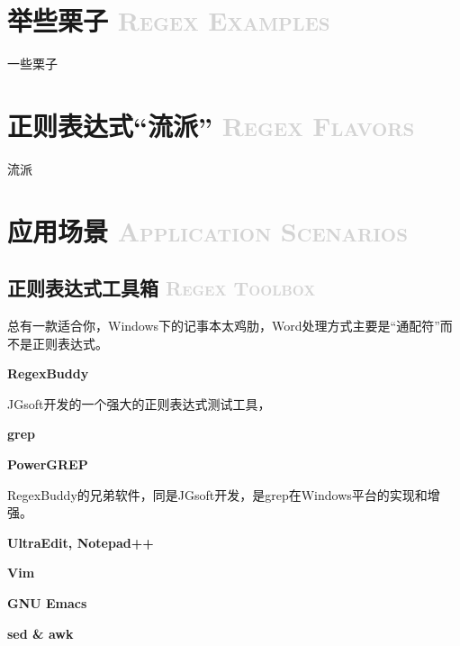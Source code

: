 \documentclass[12pt,a4paper,twoside]{ctexart}
\begin{document}
\section[举些栗子]{举些栗子 \textcolor{lightgray}{\textsc{Regex Examples}}}
\label{sec:regex-examples}

\begin{multicols}{2}
一些栗子 \par


\end{multicols}

\section[正则表达式“流派”]{正则表达式“流派” \textcolor{lightgray}{\textsc{Regex Flavors}}}
\label{sec:flavor}

\begin{multicols}{2}
流派

\end{multicols}


\section[应用场景]{应用场景 \textcolor{lightgray}{\textsc{Application Scenarios}}}
\label{sec:scenarios}

\subsection[正则表达式工具箱]{正则表达式工具箱 \textcolor{lightgray}{\textsc{Regex Toolbox}}}
\label{sec:toolbox}

总有一款适合你，Windows下的记事本太鸡肋，Word处理方式主要是“通配符”而不是正则表达式。 \par

\begin{multicols}{2}
  
\noindent\textbf{RegexBuddy} \par
JGsoft开发的一个强大的正则表达式测试工具， \par

\noindent\textbf{grep}

\noindent\textbf{PowerGREP} \par
RegexBuddy的兄弟软件，同是JGsoft开发，是grep在Windows平台的实现和增强。

\noindent\textbf{UltraEdit, Notepad++}

\noindent\textbf{Vim} \par

\noindent\textbf{GNU Emacs} \par

\noindent\textbf{sed \& awk}

\end{multicols}
\end{document}

